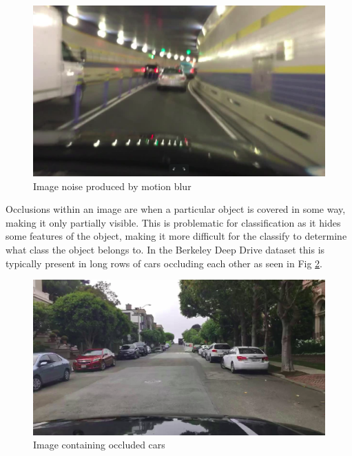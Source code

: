 \documentclass[12pt]{report}
\begin{document}
\vspace{0.5cm}
\begin{figure}[ht!]
	\centering
	\includegraphics[width=12cm]{noise}
	\caption{Image noise produced by motion blur}
	\label{fig:noiseimg}
\end{figure}

\newpage
\begin{flushleft}
Occlusions within an image are when a particular object is covered in some way, making it only partially visible. This is problematic for classification as it hides some features of the object, making it more difficult for the classify to determine what class the object belongs to. In the Berkeley Deep Drive dataset this is typically present in long rows of cars occluding each other as seen in Fig \ref{fig:occlusion}.
\end{flushleft}

\vspace{0.5cm}
\begin{figure}[ht!]
	\centering
	\includegraphics[width=12cm]{occlusion}
	\caption{Image containing occluded cars}
	\label{fig:occlusion}
\end{figure}

\newpage
\end{document}
